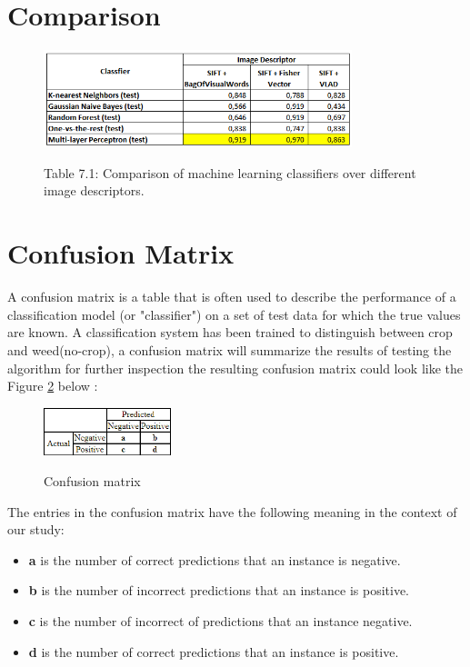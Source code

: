 \documentclass[12pt]{article}
\numberwithin{equation}{section}
\numberwithin{table}{section}
\numberwithin{figure}{section}
\begin{document}
\section{Comparison} \label{Comparison}


\begin{figure}[H] \centering
	\caption*{Table 7.1:  Comparison of machine learning classifiers over different image descriptors. }
	\includegraphics[width=0.8\textwidth]{class.png}
	\label{class}
\end{figure}


\section{Confusion Matrix} \label{cmatrix}

A confusion matrix is a table that is often used to describe the performance of a classification model (or "classifier") on a set of test data for which the true values are known.  A classification system has been trained to distinguish between crop and weed(no-crop), a confusion matrix will summarize the results of testing the algorithm for further inspection the resulting confusion matrix could look like the Figure \ref{mtx} below :

\begin{figure}[H] \centering
	\caption{Confusion matrix }
	\includegraphics[width=0.33\textwidth]{mtx.png}
	\label{mtx}
\end{figure}

The entries in the confusion matrix have the following meaning in the context of our study:

\begin{itemize}
	\item \textbf{a} is the number of correct predictions that an instance is negative.
	\item \textbf{b} is the number of incorrect predictions that an instance is positive.
	\item \textbf{c} is the number of incorrect of predictions that an instance negative.
	\item \textbf{d} is the number of correct predictions that an instance is positive.
\end{itemize}
\end{document}
